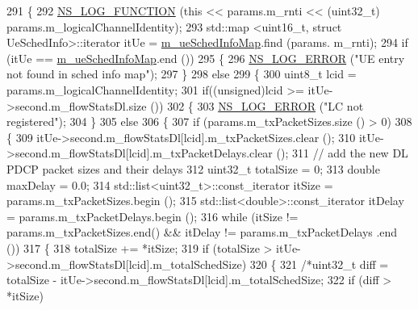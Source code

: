 \begin{DoxyCode}
291 \{
292   \hyperlink{log-macros-disabled_8h_a90b90d5bad1f39cb1b64923ea94c0761}{NS\_LOG\_FUNCTION} (\textcolor{keyword}{this} << params.m\_rnti << (uint32\_t) params.m\_logicalChannelIdentity);
293   std::map <uint16\_t, struct UeSchedInfo>::iterator itUe = \hyperlink{classns3_1_1MmWaveFlexTtiMaxRateMacScheduler_ac8359b3799f29f5b49e0f2dd52acd0ab}{m\_ueSchedInfoMap}.find (params.
      m\_rnti);
294   \textcolor{keywordflow}{if} (itUe == \hyperlink{classns3_1_1MmWaveFlexTtiMaxRateMacScheduler_ac8359b3799f29f5b49e0f2dd52acd0ab}{m\_ueSchedInfoMap}.end ())
295   \{
296         \hyperlink{group__logging_ga0261a8db1d4ac5f79417d117634fd455}{NS\_LOG\_ERROR} (\textcolor{stringliteral}{"UE entry not found in sched info map"});
297   \}
298   \textcolor{keywordflow}{else}
299   \{
300         uint8\_t lcid = params.m\_logicalChannelIdentity;
301         \textcolor{keywordflow}{if}((\textcolor{keywordtype}{unsigned})lcid >= itUe->second.m\_flowStatsDl.size ())
302         \{
303                 \hyperlink{group__logging_ga0261a8db1d4ac5f79417d117634fd455}{NS\_LOG\_ERROR} (\textcolor{stringliteral}{"LC not registered"});
304         \}
305         \textcolor{keywordflow}{else}
306         \{
307                 \textcolor{keywordflow}{if} (params.m\_txPacketSizes.size () > 0)
308                 \{
309                         itUe->second.m\_flowStatsDl[lcid].m\_txPacketSizes.clear ();
310                         itUe->second.m\_flowStatsDl[lcid].m\_txPacketDelays.clear ();
311                         \textcolor{comment}{// add the new DL PDCP packet sizes and their delays}
312                         uint32\_t totalSize = 0;
313                         \textcolor{keywordtype}{double} maxDelay = 0.0;
314                         std::list<uint32\_t>::const\_iterator itSize = params.m\_txPacketSizes.begin ();
315                         std::list<double>::const\_iterator itDelay = params.m\_txPacketDelays.begin ();
316                         \textcolor{keywordflow}{while} (itSize != params.m\_txPacketSizes.end() && itDelay != params.m\_txPacketDelays
      .end ())
317                         \{
318                                 totalSize += *itSize;
319                                 \textcolor{keywordflow}{if} (totalSize > itUe->second.m\_flowStatsDl[lcid].m\_totalSchedSize)
320                                 \{
321                                         \textcolor{comment}{/*uint32\_t diff = totalSize -
       itUe->second.m\_flowStatsDl[lcid].m\_totalSchedSize;}
322 \textcolor{comment}{                                        if (diff > *itSize)}

\end{DoxyCode}
